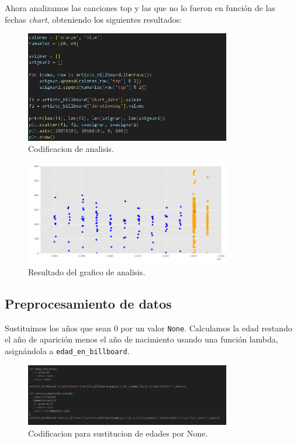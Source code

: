 \documentclass[a4paper,12pt]{article}
\begin{document}
Ahora analizamos las canciones top y las que no lo fueron en función de las fechas \textit{chart}, obteniendo los siguientes resultados:

\begin{figure}[H]
    \centering
    \includegraphics[width=0.8\textwidth]{12.png}
    \caption{Codificacion de analisis.}
    \label{fig:decision_tree}
\end{figure}

\begin{figure}[H]
    \centering
    \includegraphics[width=0.8\textwidth]{13.png}
    \caption{Resultado del grafico de analisis.}
    \label{fig:decision_tree}
\end{figure}

\subsection{Preprocesamiento de datos}
Sustituimos los años que sean 0 por un valor \texttt{None}. Calculamos la edad restando el año de aparición menos el año de nacimiento usando una función lambda, asignándola a \texttt{edad\_en\_billboard}.

\begin{figure}[H]
    \centering
    \includegraphics[width=0.8\textwidth]{14.png}
    \caption{Codificacion para sustitucion de edades por None.}
    \label{fig:decision_tree}
\end{figure}
\end{document}
